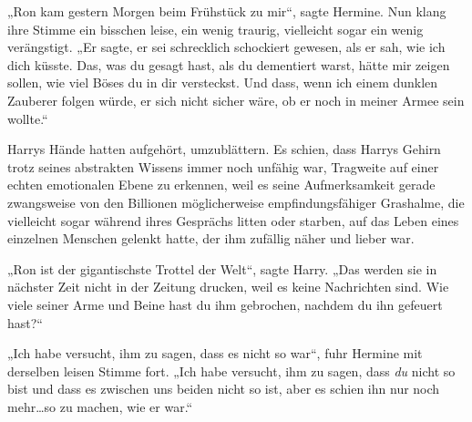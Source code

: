 „Ron kam gestern Morgen beim Frühstück zu mir“, sagte Hermine. Nun klang ihre Stimme ein bisschen leise, ein wenig traurig, vielleicht sogar ein wenig verängstigt. „Er sagte, er sei schrecklich schockiert gewesen, als er sah, wie ich dich küsste. Das, was du gesagt hast, als du dementiert warst, hätte mir zeigen sollen, wie viel Böses du in dir versteckst. Und dass, wenn ich einem dunklen Zauberer folgen würde, er sich nicht sicher wäre, ob er noch in meiner Armee sein wollte.“

Harrys Hände hatten aufgehört, umzublättern. Es schien, dass Harrys Gehirn trotz seines abstrakten Wissens immer noch unfähig war, Tragweite auf einer echten emotionalen Ebene zu erkennen, weil es seine Aufmerksamkeit gerade zwangsweise von den Billionen möglicherweise empfindungsfähiger Grashalme, die vielleicht sogar während ihres Gesprächs litten oder starben, auf das Leben eines einzelnen Menschen gelenkt hatte, der ihm zufällig näher und lieber war.

„Ron ist der gigantischste Trottel der Welt“, sagte Harry. „Das werden sie in nächster Zeit nicht in der Zeitung drucken, weil es keine Nachrichten sind. Wie viele seiner Arme und Beine hast du ihm gebrochen, nachdem du ihn gefeuert hast?“

„Ich habe versucht, ihm zu sagen, dass es nicht so war“, fuhr Hermine mit derselben leisen Stimme fort. „Ich habe versucht, ihm zu sagen, dass \emph{du} nicht so bist und dass es zwischen uns beiden nicht so ist, aber es schien ihn nur noch mehr…so zu machen, wie er war.“

